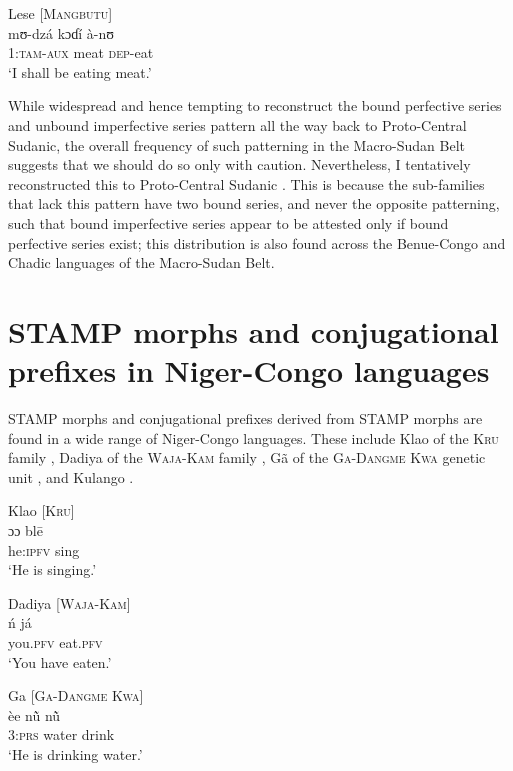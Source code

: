 \documentclass[output=paper]{langsci/langscibook}
\begin{document}
\ea\label{ex:anderson:65}
Lese \citep[51]{TuckerBryan1966}        \textsc{[Mangbutu]}\\
\gll mʊ-dzá    kɔɗí  à-nʊ\\
1:\textsc{tam-aux}  meat  \textsc{dep}-eat\\
\glt `I shall be eating meat.'  
\z

While widespread and hence tempting to reconstruct the bound perfective series and unbound imperfective series pattern all the way back to Proto-Central Sudanic, the overall frequency of such patterning in the Macro-Sudan Belt suggests that we should do so only with caution. Nevertheless, I tentatively reconstructed this to Proto-Central Sudanic \citep{Anderson2015}. This is because the sub-families that lack this pattern have two bound series, and never the opposite patterning, such that bound imperfective series appear to be attested only if bound perfective series exist; this distribution is also found across the Benue-Congo and Chadic languages of the Macro-Sudan Belt.

\section{STAMP morphs and conjugational prefixes in Niger-Congo languages}\label{sec:Anderson:9}

STAMP morphs and conjugational prefixes derived from STAMP morphs are found in a wide range of Niger-Congo languages. These include Klao of the \textsc{Kru} family , Dadiya of the \textsc{Waja-Kam} family , Gã of the \textsc{Ga-Dangme Kwa} genetic unit , and Kulango .

\ea\label{ex:anderson:66}
Klao \citep[3, 18]{Marchese1982}            [\textsc{Kru}]\\
\gll ɔɔ    bl\={e}  \\
he\textsc{:ipfv}   sing\\
\glt `He is singing.'
\z

\ea\label{ex:anderson:67}
Dadiya   \citep[196]{Jungraithmayr1968}        [\textsc{Waja-Kam]}\\
\gll \'{n}    já   \\
you\textsc{.pfv}  eat.\textsc{pfv} \\
\glt `You have eaten.'
\z

\ea\label{ex:anderson:68}
Ga \citep[105]{Kropp1988}          \textsc{[Ga-Dangme Kwa]}  \\
\gll èe     n\`{\~u}  n\`{\~u}  \\
3\textsc{:prs}  water  drink\\
\glt `He is drinking water.'
\z
\end{document}
